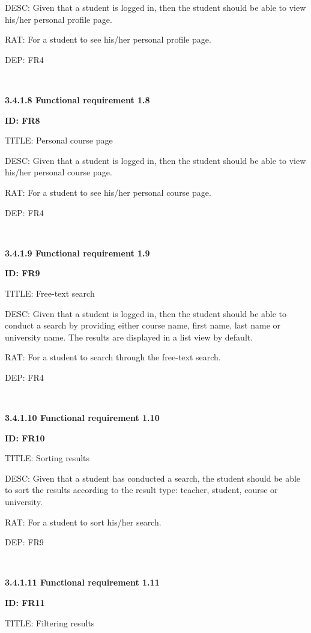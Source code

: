 \documentclass[12pt,a4paper]{article}
\begin{document}
\begin{flushleft}
        DESC: Given that a student is logged in, then the student should be able
        to view his/her personal profile page.

        RAT: For a student to see his/her personal profile page.

        DEP: FR4


        \
\newpage


        \textbf{3.4.1.8 Functional requirement 1.8}

        \textbf{ID: FR8}

        TITLE: Personal course page

        DESC: Given that a student is logged in, then the student should be able
        to view his/her personal course page.

        RAT: For a student to see his/her personal course page.

        DEP: FR4

        \

        \textbf{3.4.1.9 Functional requirement 1.9}

        \textbf{ID: FR9}

        TITLE: Free-text search

        DESC: Given that a student is logged in, then the student should be able
        to conduct a search by providing either course name, first name, last
        name or university name. The results are displayed in a list view by
        default.

        RAT: For a student to search through the free-text search.

        DEP: FR4

        \

        \textbf{3.4.1.10 Functional requirement 1.10}

        \textbf{ID: FR10}

        TITLE: Sorting results

        DESC: Given that a student has conducted a search, the student should be
        able to sort the results according to the result type: teacher, student,
        course or university.

        RAT: For a student to sort his/her search.

        DEP: FR9

        \

        \textbf{3.4.1.11 Functional requirement 1.11}

        \textbf{ID: FR11}

        TITLE: Filtering results


\end{flushleft}
\end{document}
